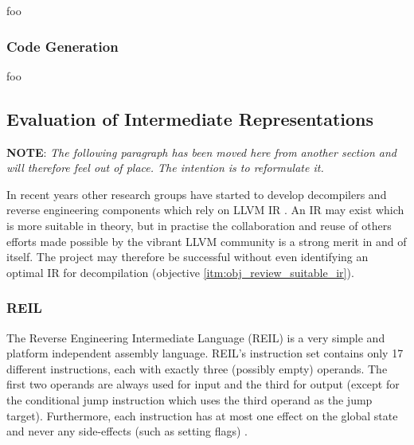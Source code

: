 foo


\subsubsection{Code Generation}

foo


\subsection{Evaluation of Intermediate Representations}




\textbf{NOTE}: \textit{The following paragraph has been moved here from another section and will therefore feel out of place. The intention is to reformulate it.}

In recent years other research groups have started to develop decompilers and reverse engineering components which rely on LLVM IR \cite{decomp_llvm,retargetable_decomp,mcsema}. An IR may exist which is more suitable in theory, but in practise the collaboration and reuse of others efforts made possible by the vibrant LLVM community is a strong merit in and of itself. The project may therefore be successful without even identifying an optimal IR for decompilation (objective \ref{itm:obj_review_suitable_ir}).


\subsubsection{REIL}

The Reverse Engineering Intermediate Language (REIL) is a very simple and platform independent assembly language. REIL's instruction set contains only 17 different instructions, each with exactly three (possibly empty) operands. The first two operands are always used for input and the third for output (except for the conditional jump instruction which uses the third operand as the jump target). Furthermore, each instruction has at most one effect on the global state and never any side-effects (such as setting flags) \cite{reil,reil_spec}.

